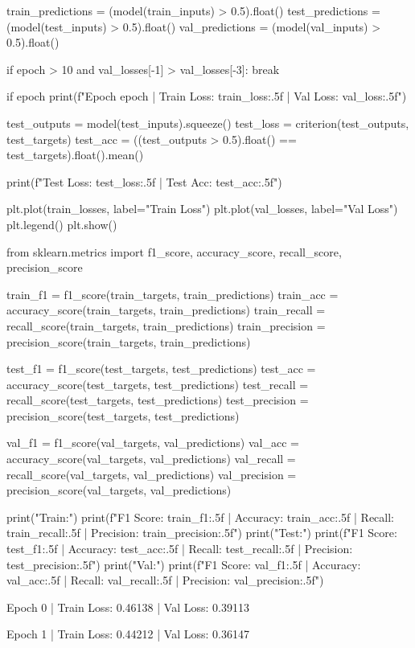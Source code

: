 \documentclass[11pt]{article}
\begin{document}
\begin{python}
        train_predictions = (model(train_inputs) > 0.5).float()
        test_predictions = (model(test_inputs) > 0.5).float()
        val_predictions = (model(val_inputs) > 0.5).float()

    
    if epoch > 10 and val_losses[-1] > val_losses[-3]:
        break

    
    if epoch %
        print(f"Epoch {epoch} | Train Loss: {train_loss:.5f} | Val Loss: {val_loss:.5f}")



test_outputs = model(test_inputs).squeeze()
test_loss = criterion(test_outputs, test_targets)
test_acc = ((test_outputs > 0.5).float() == test_targets).float().mean()

print(f"Test Loss: {test_loss:.5f} | Test Acc: {test_acc:.5f}")

plt.plot(train_losses, label="Train Loss")
plt.plot(val_losses, label="Val Loss")
plt.legend()
plt.show()


from sklearn.metrics import f1_score, accuracy_score, recall_score, precision_score

train_f1 = f1_score(train_targets, train_predictions)
train_acc = accuracy_score(train_targets, train_predictions)
train_recall = recall_score(train_targets, train_predictions)
train_precision = precision_score(train_targets, train_predictions)

test_f1 = f1_score(test_targets, test_predictions)
test_acc = accuracy_score(test_targets, test_predictions)
test_recall = recall_score(test_targets, test_predictions)
test_precision = precision_score(test_targets, test_predictions)

val_f1 = f1_score(val_targets, val_predictions)
val_acc = accuracy_score(val_targets, val_predictions)
val_recall = recall_score(val_targets, val_predictions)
val_precision = precision_score(val_targets, val_predictions)


print("Train:")
print(f"F1 Score: {train_f1:.5f} | Accuracy: {train_acc:.5f} | Recall: {train_recall:.5f} | Precision: {train_precision:.5f}")
print("Test:")
print(f"F1 Score: {test_f1:.5f} | Accuracy: {test_acc:.5f} | Recall: {test_recall:.5f} | Precision: {test_precision:.5f}")
print("Val:")
print(f"F1 Score: {val_f1:.5f} | Accuracy: {val_acc:.5f} | Recall: {val_recall:.5f} | Precision: {val_precision:.5f}")

\end{python}

Epoch 0 | Train Loss: 0.46138 | Val Loss: 0.39113

Epoch 1 | Train Loss: 0.44212 | Val Loss: 0.36147
\end{document}
